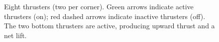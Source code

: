 \begin{figure}[h!]
\vspace{25pt}

\begin{minipage}{0.45\linewidth}
\centering
{}
\end{minipage}
\begin{minipage}{0.45\linewidth}
\centering
{}
\end{minipage}



\caption{Eight thrusters (two per corner). Green arrows indicate active thrusters (on); red dashed arrows indicate inactive thrusters (off). The two bottom thrusters are active, producing upward thrust and a net lift.}
\label{fig:simple_slider_onoff}
\end{figure}






